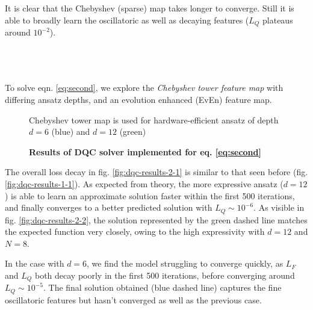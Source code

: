 \documentclass[11pt,a4paper]{article}
\begin{document}
{It is clear that the Chebyshev (sparse) map takes longer to converge. Still it is able to broadly learn the oscillatoric as well as decaying features ($L_Q$ plateaus around $10^{-2}$).

\\ \\\\

To solve eqn. \ref{eq:second}, we explore the \textit{Chebyshev tower feature map} with differing ansatz depths, and an evolution enhanced (EvEn) feature map.

\begin{figure}[H]
    \centering
    \caption{\textbf{Results of DQC solver implemented for eq. \ref{eq:second}}}
    Chebyshev tower map is used for hardware-efficient ansatz of depth $d=6$ (blue) and $d=12$ (green)
    \label{fig:dqc-results-2}
\end{figure}

The overall loss decay in fig. \ref{fig:dqc-results-2-1} is similar to that seen before (fig. \ref{fig:dqc-results-1-1}). As expected from theory, the more expressive ansatz ($d=12$) is able to learn an approximate solution faster within the first 500 iterations, and finally converges to a better predicted solution with $L_Q \sim 10^{-6}$. As visible in fig. \ref{fig:dqc-results-2-2}, the solution represented by the green dashed line matches the expected function very closely, owing to the high expressivity with $d=12$ and $N=8$.

In the case with $d=6$, we find the model struggling to converge quickly, as $L_F$ and $L_Q$ both decay poorly in the first 500 iterations, before converging around $L_Q \sim 10^{-5}$. The final solution obtained (blue dashed line) captures the fine oscillatoric features but hasn't converged as well as the previous case.

}
\end{document}
